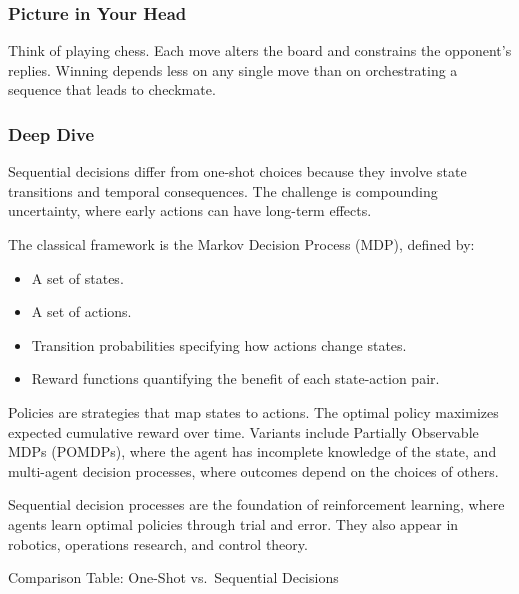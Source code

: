 \documentclass[
  letterpaper,
  DIV=11,
  numbers=noendperiod]{scrreprt}
\providecommand{\tightlist}{%
  \setlength{\itemsep}{0pt}\setlength{\parskip}{0pt}}
\begin{document}
\subsubsection{Picture in Your Head}\label{picture-in-your-head-68}

Think of playing chess. Each move alters the board and constrains the
opponent's replies. Winning depends less on any single move than on
orchestrating a sequence that leads to checkmate.

\subsubsection{Deep Dive}\label{deep-dive-68}

Sequential decisions differ from one-shot choices because they involve
state transitions and temporal consequences. The challenge is
compounding uncertainty, where early actions can have long-term effects.

The classical framework is the Markov Decision Process (MDP), defined
by:

\begin{itemize}
\tightlist
\item
  A set of states.
\item
  A set of actions.
\item
  Transition probabilities specifying how actions change states.
\item
  Reward functions quantifying the benefit of each state-action pair.
\end{itemize}

Policies are strategies that map states to actions. The optimal policy
maximizes expected cumulative reward over time. Variants include
Partially Observable MDPs (POMDPs), where the agent has incomplete
knowledge of the state, and multi-agent decision processes, where
outcomes depend on the choices of others.

Sequential decision processes are the foundation of reinforcement
learning, where agents learn optimal policies through trial and error.
They also appear in robotics, operations research, and control theory.

Comparison Table: One-Shot vs.~Sequential Decisions
\end{document}
